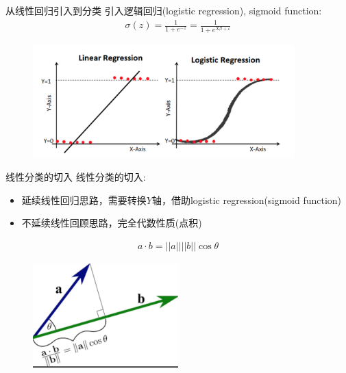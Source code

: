 \documentclass[handout]{ctexbeamer}
\begin{document}
\begin{frame}{从线性回归引入到分类}
引入逻辑回归(logistic regression), sigmoid function:
	\begin{align*}
		\sigma(z) = \frac{1}{1+e^{-z}} = \frac{1}{1+e^{X\beta + \varepsilon}}
	\end{align*}
	\begin{figure}[H]
		\centering
		\includegraphics[width=0.9\textwidth]{fig/logisticreg3}
	\end{figure}
\end{frame}



\begin{frame}{线性分类的切入}
	线性分类的切入:
	\begin{itemize}
	\setlength\itemsep{0.6em}
		\item 延续线性回归思路，需要转换$Y$轴，借助logistic regression(sigmoid function) 
		\item 不延续线性回顾思路，完全代数性质(点积)
	\end{itemize}
	\begin{align*}
		a \cdot b = ||a|| ||b|| \cos \theta
	\end{align*}
	\begin{figure}[H]
		\centering
		\includegraphics[width=0.5\textwidth]{fig/C2C2svmprojc}
	\end{figure}
\end{frame}
\end{document}
